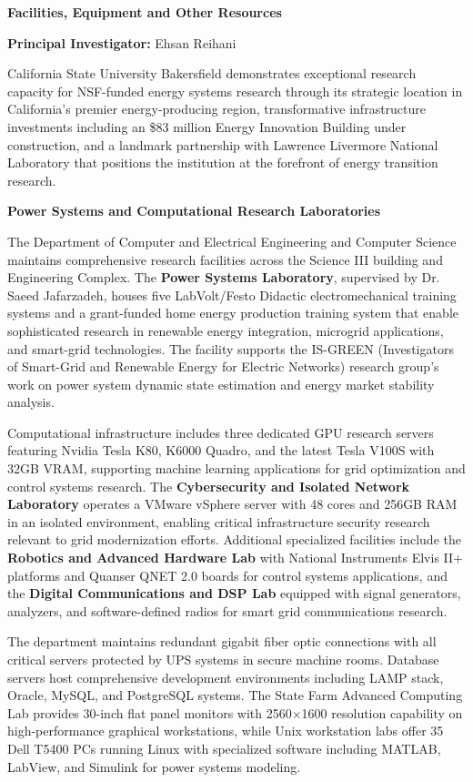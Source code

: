 \documentclass[11pt]{article}
\begin{document}
\textbf{\Large Facilities, Equipment and Other Resources}

\textbf{Principal Investigator:} Ehsan Reihani

California State University Bakersfield demonstrates exceptional research capacity for NSF-funded energy systems research through its strategic location in California's premier energy-producing region, transformative infrastructure investments including an \$83 million Energy Innovation Building under construction, and a landmark partnership with Lawrence Livermore National Laboratory that positions the institution at the forefront of energy transition research.

\textbf{Power Systems and Computational Research Laboratories}

The Department of Computer and Electrical Engineering and Computer Science maintains comprehensive research facilities across the Science III building and Engineering Complex. The \textbf{Power Systems Laboratory}, supervised by Dr. Saeed Jafarzadeh, houses five LabVolt/Festo Didactic electromechanical training systems and a grant-funded home energy production training system that enable sophisticated research in renewable energy integration, microgrid applications, and smart-grid technologies. The facility supports the IS-GREEN (Investigators of Smart-Grid and Renewable Energy for Electric Networks) research group's work on power system dynamic state estimation and energy market stability analysis.

Computational infrastructure includes three dedicated GPU research servers featuring Nvidia Tesla K80, K6000 Quadro, and the latest Tesla V100S with 32GB VRAM, supporting machine learning applications for grid optimization and control systems research. The \textbf{Cybersecurity and Isolated Network Laboratory} operates a VMware vSphere server with 48 cores and 256GB RAM in an isolated environment, enabling critical infrastructure security research relevant to grid modernization efforts. Additional specialized facilities include the \textbf{Robotics and Advanced Hardware Lab} with National Instruments Elvis II+ platforms and Quanser QNET 2.0 boards for control systems applications, and the \textbf{Digital Communications and DSP Lab} equipped with signal generators, analyzers, and software-defined radios for smart grid communications research.

The department maintains redundant gigabit fiber optic connections with all critical servers protected by UPS systems in secure machine rooms. Database servers host comprehensive development environments including LAMP stack, Oracle, MySQL, and PostgreSQL systems. The State Farm Advanced Computing Lab provides 30-inch flat panel monitors with 2560×1600 resolution capability on high-performance graphical workstations, while Unix workstation labs offer 35 Dell T5400 PCs running Linux with specialized software including MATLAB, LabView, and Simulink for power systems modeling.
\end{document}
